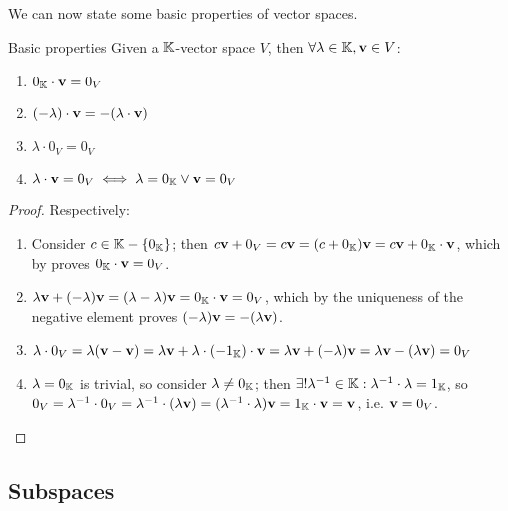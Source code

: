 We can now state some basic properties of vector spaces.

\begin{lemma}{Basic properties}{}
  Given a $ \mathbb{K} $-vector space $ V $, then $ \forall \lambda \in \mathbb{K} , \mathbf{v} \in V $:
  \begin{multicols}{2}
    \begin{enumerate}[label={\alph*.}]
      \item $ 0_{\mathbb{K}} \cdot \mathbf{v} = 0_V $
      \item $ (-\lambda) \cdot \mathbf{v} = - (\lambda \cdot \mathbf{v}) $
      \item $ \lambda \cdot 0_V = 0_V $
      \item $ \lambda \cdot \mathbf{v} = 0_V \iff \lambda = 0_{\mathbb{K}} \lor \mathbf{v} = 0_V $
    \end{enumerate}
  \end{multicols}
\end{lemma}

\begin{proofbox}
  \begin{proof}
    Respectively:
    \begin{enumerate}[label={\alph*.}]
      \item Consider $ c \in \mathbb{K} - \{0_{\mathbb{K}}\} $; then $ c \mathbf{v} + 0_V = c \mathbf{v} = (c + 0_{\mathbb{K}}) \mathbf{v} = c \mathbf{v} + 0_{\mathbb{K}} \cdot \mathbf{v} $, which by  proves $ 0_{\mathbb{K}} \cdot \mathbf{v} = 0_V $.
      \item $ \lambda \mathbf{v} + (-\lambda) \mathbf{v} = (\lambda - \lambda) \mathbf{v} = 0_{\mathbb{K}} \cdot \mathbf{v} = 0_V $, which by the uniqueness of the negative element proves $ (-\lambda) \mathbf{v} = - (\lambda \mathbf{v}) $.
      \item $ \lambda \cdot 0_V = \lambda (\mathbf{v} - \mathbf{v}) = \lambda \mathbf{v} + \lambda \cdot (-1_{\mathbb{K}}) \cdot \mathbf{v} = \lambda \mathbf{v} + (-\lambda) \mathbf{v} = \lambda \mathbf{v} - (\lambda \mathbf{v}) = 0_V $
      \item $ \lambda = 0_{\mathbb{K}} $ is trivial, so consider $ \lambda \neq 0_{\mathbb{K}} $; then $ \exists ! \lambda^{-1} \in \mathbb{K} : \lambda^{-1} \cdot \lambda = 1_{\mathbb{K}} $, so $ 0_V = \lambda^{-1} \cdot 0_V = \lambda^{-1} \cdot (\lambda \mathbf{v}) = (\lambda^{-1} \cdot \lambda) \mathbf{v} = 1_{\mathbb{K}} \cdot \mathbf{v} = \mathbf{v} $, i.e. $ \mathbf{v} = 0_V $.
    \end{enumerate}
  \end{proof}
\end{proofbox}

\subsection{Subspaces}

